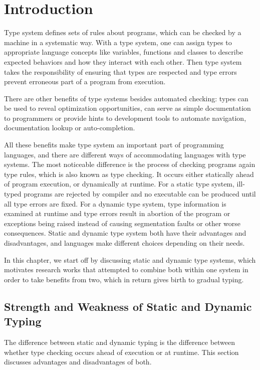 
\renewcommand{\thechapter}{1}

\chapter{Introduction}

Type system defines sets of rules about programs, which can be checked by a machine
in a systematic way.
With a type system, one can assign types to appropriate language concepts like variables, functions and classes to describe expected behaviors and how they interact with each other.
Then type system takes the responsibility of ensuring that types are respected and
type errors prevent erroneous part of a program from execution.

There are other benefits of type systems besides automated checking:
types can be used to reveal optimization opportunities,
can serve as simple documentation to programmers or
provide hints to development tools to automate navigation, documentation lookup
or auto-completion.

All these benefits make type system an important part of programming languages,
and there are different ways of accommodating languages with type systems.
The most noticeable difference is the process of checking programs again type rules,
which is also known as type checking.
It occurs either statically ahead of program execution, or dynamically at runtime.
For a static type system, ill-typed programs are rejected by compiler and
no executable can be produced until all type errors are fixed.
For a dynamic type system, type information is examined at runtime and type errors result
in abortion of the program or exceptions being raised
instead of causing segmentation faults or other worse consequences.
Static and dynamic type system both have their advantages and disadvantages,
and languages make different choices depending on their needs.

In this chapter, we start off by discussing static and dynamic type systems,
which motivates research works that attempted to combine both within one system
in order to take benefits from two,
which in return gives birth to gradual typing.

\section{Strength and Weakness of Static and Dynamic Typing}

The difference between static and dynamic typing is the difference
between whether type checking occurs ahead of execution or at runtime.
This section discusses advantages and disadvantages of both.

